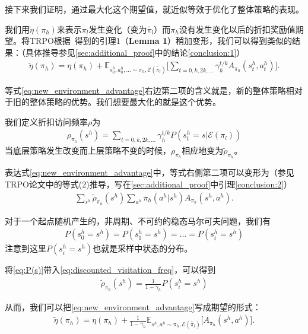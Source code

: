 接下来我们证明，通过最大化这个期望值，就近似等效于优化了整体策略的表现。

我们用$\tilde{\eta}(\pi_h)$来表示$\pi_l$发生变化（变为$\tilde{\pi_l}$）而$\pi_h$没有发生变化以后的折扣奖励值期望。将TRPO根据~\cite{TRPO_pre}得到的引理1（\textbf{Lemma 1}）稍加变形，我们可以得到类似的结果：（具体推导参见\ref{sec:additional_proof}中的结论\ref{conclusion:1}）
\begin{align}
  \tilde{\eta}(\pi_h) = \eta(\pi_h) + \mathbb{E}_{s_0^h, a_0^h, ... \sim \pi_h, \mathcal{E}(\tilde{\pi_l})}\Bigg[\sum_{t=0,k,2k,...} \gamma_h^{t/k} A_{\pi_h}(s_t^h, a_t^h)\Bigg].
  \label{eq:new_environment_advantage}
\end{align}

等式\eqref{eq:new_environment_advantage}右边第二项的含义就是，新的整体策略相对于旧的整体策略的优势。我们想要最大化的就是这个优势。

我们定义折扣访问频率$\rho$为
\begin{align}
  \rho_{\pi_h}(s^h) = \sum_{t = 0, k, 2k, ...}\gamma_h^{t/k}P(s_t^h = s|\mathcal{E}(\pi_l))
  \label{eq:discounted_visitation_freq}
\end{align}
当底层策略发生改变而上层策略不变的时候，$\rho_{\pi_h}$相应地变为$\tilde{\rho}_{\pi_h}$。

表达式\eqref{eq:new_environment_advantage}中，等式右侧第二项可以变形为（参见TRPO论文中的等式(2)推导，写在\ref{sec:additional_proof}中引理\ref{conclusion:2}）
\begin{align}
  \sum_{s^h}\tilde{\rho}_{\pi_h}(s^h)\sum_{a^h}\pi_h(a^h|s^h)A_{\pi_h}(s^h,a^h).
  \label{eq:accurate_objective}
\end{align}

对于一个起点随机产生的，非周期、不可约的稳态马尔可夫问题，我们有
\begin{align}
  P(s_0^h = s^h) = P(s_1^h = s^h) = ... = P(s_i^h = s^h)
  \label{eq:P(s)}
\end{align}
注意到这里$P(s_i^h = s^h)$也就是采样中状态的分布。

将\eqref{eq:P(s)}带入\eqref{eq:discounted_visitation_freq}，可以得到
\begin{align}
  \tilde{\rho}_{\pi_h}(s^h) = \frac{1}{1-\gamma_h}P(s_i^h = s^h)
  \label{eq:rho_constant}
\end{align}

从而，我们可以把\eqref{eq:new_environment_advantage}写成期望的形式：
\begin{align}
  \tilde{\eta}(\pi_h) = \eta(\pi_h) + \frac{1}{1-\gamma_h}\mathbb{E}_{s^h, a^h \sim \pi_h, \mathcal{E}(\tilde{\pi_l})}\bigg[A_{\pi_h}(s^h, a^h)\bigg].
  \label{eq:accurate_objective_expectation_form}
\end{align}

